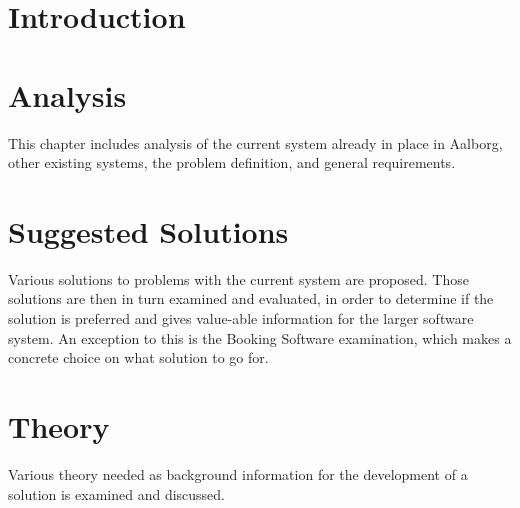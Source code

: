 
\usepackage[draft]{fixme}				%
\usepackage[disable]{todonotes}					%
\newcommand{\bycykelwithoutspace}{Aalborg Bycykel}
\newcommand{\bycykel}{\bycykelwithoutspace{ }}


	
	\newpage\null\thispagestyle{empty}\newpage
	
	\addtocounter{page}{4}
	\newpage\null\thispagestyle{empty}\newpage
	
	\newpage\null\thispagestyle{empty}\newpage
	
	\label{startoftoc}
	\begin{KeepFromToc}
		\tableofcontents
		\newpage\null\thispagestyle{empty}\newpage
		\newpage\null\thispagestyle{empty}\newpage
		\todototoc
		\listoftodos
	\end{KeepFromToc}
	\label{endoftoc}
	
	\chapter{Introduction}
	
	\chapter{Analysis}
	This chapter includes analysis of the current system already in place in Aalborg, other existing systems, the problem definition, and general requirements.
	
	
	
	
	
	\chapter{Suggested Solutions}
	Various solutions to problems with the current system are proposed.
	Those solutions are then in turn examined and evaluated, in order to determine if the solution is preferred and gives value-able information for the larger software system.
	An exception to this is the Booking Software examination, which makes a concrete choice on what solution to go for.
	
	
	
	
	
	
	\chapter{Theory}
	Various theory needed as background information for the development of a solution is examined and discussed.
	
	
	\afterpage{\thispagestyle{empty}}

	
	
	\label{lastpagewithoutappendix}

	\appendix
	
	\cleardoublepage

